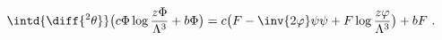 \begin{equation}
  \label{eq:vysuperpot}
  \intd{\diff{^2 \theta}} \bigl(c \Phi \log
  \frac{z \Phi}{\Lambda^3} + b \Phi \bigr) = c \bigl( F
  - \inv{2 \varphi} \psi \psi + F \log \frac{z \varphi}{\Lambda^3} \bigr) + b F\ .
\end{equation}

